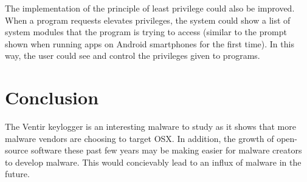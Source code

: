 \documentclass[conference]{IEEEtran}
\begin{document}
The implementation of the principle of least privilege could also be improved.
When a program requests elevates privileges, the system could show a list of
system modules that the program is trying to access (similar to the prompt shown
when running apps on Android smartphones for the first time). In this way, the
user could see and control the privileges given to programs.

\section{Conclusion}
The Ventir keylogger is an interesting malware to study as it shows that more
malware vendors are choosing to target OSX. In addition, the growth of
open-source software these past few years may be making easier for malware
creators to develop malware. This would concievably lead to an influx of malware
in the future.

\printbibliography
\end{document}
